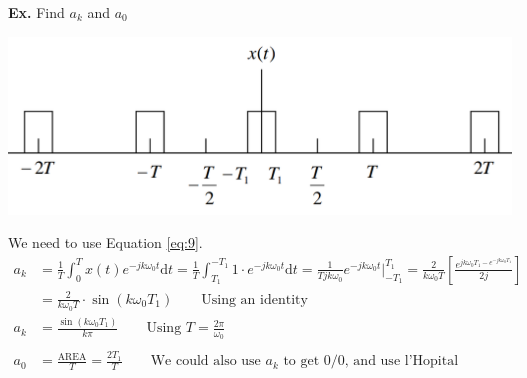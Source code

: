 \documentclass[12pt,letterpaper]{article} \usepackage{amsmath} \usepackage{graphicx} \usepackage[margin=1in]{geometry} \usepackage{longtable}  \usepackage{amssymb}
\begin{document}
	\begin{mdframed}
		\textbf{Ex.} Find $a_k$ and $a_0$
		
		\centering
		
		\includegraphics[width=0.7\linewidth]{images/ex2}
		
		\raggedright
		We need to use Equation \ref{eq:9}.
		\begin{align*}
			a_k &= \frac{1}{T}\int^T_0 x(t)e^{-jk\omega_0 t}\mathrm d t = \frac{1}{T}\int^{-T_1}_{T_1} 1\cdot e^{-jk\omega_0 t}\mathrm d t = \frac{1}{Tjk\omega_0}e^{-jk\omega_0 t}|^{T_1}_{-T_1} = \frac{2}{k\omega_0 T}\left[\frac{e^{jk\omega_0 T_1 - e^{-jk\omega_0 T_1}}}{2j}\right]\\
			&= \frac{2}{k\omega_0T}\cdot \sin(k\omega_0T_1) \qquad \text{Using an identity} \\
			a_k&= \frac{\sin(k\omega_0 T_1)}{k\pi} \qquad \text{Using $T = \frac{2\pi}{\omega_0}$}\\
			\\
			a_0 &= \frac{\text{AREA}}{T} = \frac{2T_1}{T} \qquad \text{We could also use $a_k$ to get 0/0, and use l'Hopital}
		\end{align*}
		
	\end{mdframed}
	
\end{document}

